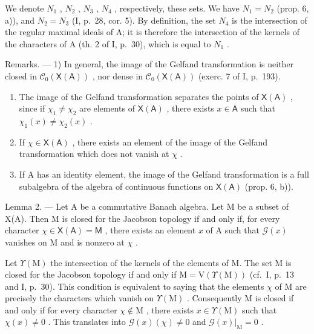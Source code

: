 We denote \(N_{1}\) , \(N_{2}\) , \(N_{3}\) , \(N_{4}\) , respectively, these sets. We have \(N_{1} = N_{2}\) (prop. 6, a)), and \(N_{2} = N_{3}\) (I, p.~28, cor. 5). By definition, the set \(N_{4}\) is the intersection of the regular maximal ideals of A; it is therefore the intersection of the kernels of the characters of A (th. 2 of I, p.~30), which is equal to \(N_{1}\) .

Remarks. --- 1) In general, the image of the Gelfand transformation is neither closed in \(\mathcal{C}_{0}(\mathsf{X}(\mathsf{A}))\) , nor dense in \(\mathcal{C}_{0}(\mathsf{X}(\mathsf{A}))\) (exerc. 7 of I, p.~193).

\begin{enumerate}
\def\labelenumi{\arabic{enumi})}
\setcounter{enumi}{1}
\item
  The image of the Gelfand transformation separates the points of \(\mathsf{X}(\mathsf{A})\) , since if \(\chi_1 \neq \chi_2\) are elements of \(\mathsf{X}(\mathsf{A})\) , there exists \(x \in \mathsf{A}\) such that \(\chi_1(x) \neq \chi_2(x)\) .
\item
  If \(\chi \in \mathsf{X}(\mathsf{A})\) , there exists an element of the image of the Gelfand transformation which does not vanish at \(\chi\) .
\item
  If A has an identity element, the image of the Gelfand transformation is a full subalgebra of the algebra of continuous functions on \(\mathsf{X}(\mathsf{A})\) (prop. 6, b)).
\end{enumerate}

Lemma 2. --- Let A be a commutative Banach algebra. Let M be a subset of X(A). Then M is closed for the Jacobson topology if and only if, for every character \(\chi \in \mathsf{X}(\mathsf{A}) = \mathsf{M}\) , there exists an element \(x\) of A such that \(\mathcal{G}(x)\) vanishes on M and is nonzero at \(\chi\) .

Let \(\Upsilon(\mathrm{M})\) the intersection of the kernels of the elements of M. The set M is closed for the Jacobson topology if and only if \(\mathrm{M} = \mathrm{V}(\Upsilon(\mathrm{M}))\) (cf.~I, p.~13 and I, p.~30). This condition is equivalent to saying that the elements \(\chi\) of M are precisely the characters which vanish on \(\Upsilon(\mathrm{M})\) . Consequently M is closed if and only if for every character \(\chi \notin \mathrm{M}\) , there exists \(x \in \Upsilon(\mathrm{M})\) such that \(\chi(x) \neq 0\) . This translates into \(\mathcal{G}(x)(\chi) \neq 0\) and \(\mathcal{G}(x)|_{\mathrm{M}} = 0\) .


